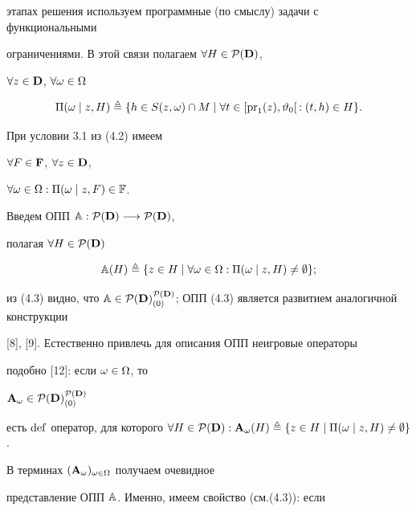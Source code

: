 этапах решения используем программные (по смыслу) задачи с функциональными


ограничениями. В этой связи полагаем $\forall{H} \in {{\cal P}({\bold D})}$,


$\forall{z} \in {\bold D}$, $\forall{\omega} \in \Omega$


\begin{equation}


{\Pi}(\omega \mid z,H) \stac \{h \in S(z,\omega) \cap M \mid \fo{t} \in


[{\pr_1}(z),{{\vt}_0}[\,:(t,h) \in H\}.


\end{equation}


При условии 3.1 из (4.2) имеем


$\forall{F} \in {\bold F}$, $\forall{z} \in {\bold D}$,


$\forall{\omega} \in \Omega:{\Pi}(\omega \mid z,F) \in {\Bbb F}$.





Введем ОПП ${\Bbb A}:{{\cal P}({\bold D})} \longrightarrow {{\cal P}({\bold D})}$,


полагая $\forall{H} \in {{\cal P}({\bold D})}$


\begin{equation}


{{\Bbb A}(H)} \stac \{z \in H \mid \fo{\omega} \in \Om:


{\Pi}(\omega \mid z,H) \ne \emp\};


\end{equation}


из (4.3) видно, что ${\Bbb A} \in {{\cal P}({\bold D})}^{{\cal P}({\bold


D})}_{(0)}$; ОПП (4.3) является развитием аналогичной конструкции


[8], [9]. Естественно привлечь для описания ОПП неигровые операторы


подобно [12]: если $\omega \in \Omega$, то


${{\bold A}_\omega} \in {{\cal P}({\bold D})}^{{\cal P}({\bold D})}_{(0)}$


есть $\Def$ оператор, для которого $\fo{H} \in {{\cal P}({\bold D})}:


{{\bold A}_\omega}(H)\stac\{z\in H \mid {\Pi}(\omega \mid z,H) \ne \emp\}$.


В терминах $({\bold A}_\omega)_{\omega \in \Omega}$ получаем очевидное


представление ОПП ${\Bbb A}$. Именно, имеем свойство (см.(4.3)): если


